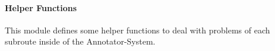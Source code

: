 \documentclass[a4paper,12pt,english]{sphinxmanual}
\begin{document}
\label{\detokenize{project_rst/annotator_rst/helpers:module-project.annotator.helpers}}

\paragraph{Helper Functions}
\label{\detokenize{project_rst/annotator_rst/helpers:helper-functions}}\label{\detokenize{project_rst/annotator_rst/helpers::doc}}
 

This module defines some helper functions to deal with problems of each subroute
inside of the Annotator-System.
\end{document}
